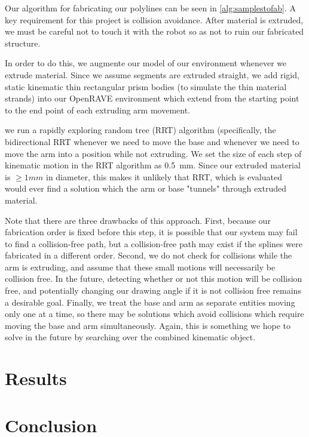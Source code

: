 \documentclass[conference]{acmsiggraph}
\begin{document}
Our algorithm for fabricating our polylines can be seen in \ref{alg:samplestofab}.  A key requirement for this project is collision avoidance.  After material is extruded, we must be careful not to touch it with the robot so as not to ruin our fabricated structure.

In order to do this, we augmente our model of our environment whenever we extrude material.  Since we assume segments are extruded straight, we add rigid, static kinematic thin rectangular prism bodies (to simulate the thin material strands) into our OpenRAVE environment which extend from the starting point to the end point of each extruding arm movement.

we run a rapidly exploring random tree (RRT) \cite{RRT} algorithm (specifically, the bidirectional RRT \cite{biRRT} whenever we need to move the base and whenever we need to move the arm into a position while not extruding.  We set the size of each step of kinematic motion in the RRT algorithm as 0.5~mm.  Since our extruded material is $\geq 1mm$ in diameter, this makes it unlikely that RRT, which is evaluated would ever find a solution which the arm or base "tunnels" through extruded material.

Note that there are three drawbacks of this approach. First, because our fabrication order is fixed before this step, it is possible that our system may fail to find a collision-free path, but a collision-free path may exist if the splines were fabricated in a different order.  Second, we do not check for collisions while the arm is extruding, and assume that these small motions will necessarily be collision free.  In the future, detecting whether or not this motion will be collision free, and potentially changing our drawing angle if it is not collision free remains a desirable goal.  Finally, we treat the base and arm as separate entities moving only one at a time, so there may be solutions which avoid collisions which require moving the base and arm simultaneously.  Again, this is something we hope to solve in the future by searching over the combined kinematic object.

\section{Results}

\section{Conclusion}
\end{document}
